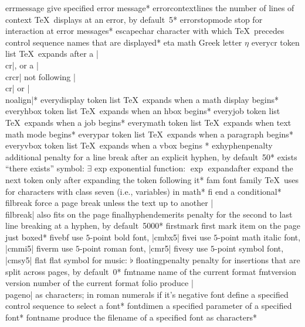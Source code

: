 \capcs errmessage {give specified error message}*{}
\capcs errorcontextlines {the number of lines of context \TeX\
   displays at an error, by default~5}*{}
\capcs errorstopmode {stop for interaction at error messages}*{}
\capcs escapechar {character with which \TeX\ precedes control sequence
   names that are displayed}*{}
\capcs eta {math Greek letter $\eta$}{}{}
\capcs everycr {token list \TeX\ expands after a |\\cr|, or a |\\crcr|
   not following |\\cr| or |\\noalign|}*{}
\capcs everydisplay {token list \TeX\ expands when a math display begins}*{}
\capcs everyhbox {token list \TeX\ expands when an hbox begins}*{}
\capcs everyjob {token list \TeX\ expands when a job begins}*{}
\capcs everymath {token list \TeX\ expands when text math mode
   begins}*{}
\capcs everypar {token list \TeX\ expands when a paragraph begins}*{}
\capcs everyvbox {token list \TeX\ expands when a vbox begins }*{}
\capcs exhyphenpenalty {additional penalty for a line break after 
   an explicit hyphen, by default~50}*{}
\capcs exists {``there exists'' symbol: $\exists$}{}{}
\capcs exp {exponential function: $\exp$}{}{}
\capcs expandafter {expand the next token only after expanding the token
   following it}*{}
\capcs fam {font family \TeX\ uses for characters with class seven
   (i.e., variables) in math}*{}
\capcs fi {end a conditional}*{\@fi}
\capcs filbreak {force a page break unless the text up to another |\\filbreak|
   also  fits on the page}{}{}
\capcs finalhyphendemerits {penalty for the second to last line breaking at a
   hyphen, by default~5000}*{}
\capcs firstmark {first mark item on the page just boxed}*{}
\capcs fivebf {use $5$-point bold font, |cmbx5|}{}{}
\capcs fivei {use $5$-point math italic font, |cmmi5|}{}{}
\capcs fiverm {use $5$-point roman font, |cmr5|}{}{}
\capcs fivesy {use $5$-point symbol font, |cmsy5|}{}{}
\capcs flat {flat symbol for music: $\flat$}{}{}
\capcs floatingpenalty {penalty for insertions that are split across
   pages, by default~0}*{}
\capcs fmtname {name of the current format}{}{}
\capcs fmtversion {version number of the current format}{}{}
\capcs folio {produce |\\pageno| as characters; 
   in roman numerals if it's negative}{}{}
\capcs font {define a specified control sequence to select a font}*{}
\capcs fontdimen {a specified parameter of a specified font}*{}
\capcs fontname {produce the filename of a specified font as characters}*{}
